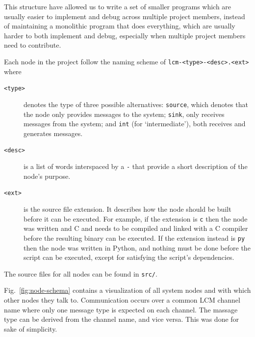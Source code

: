 This structure have allowed us to write a set of smaller programs which are usually easier to implement and debug across multiple project members,
instead of maintaining a monolithic program that does everything, which are usually harder to both implement and debug,
especially when multiple project members need to contribute.


Each node in the project follow the naming scheme of \texttt{lcm-<type>-<desc>.<ext>} where
\begin{description}
\item[\texttt{<type>}] denotes the type of three possible alternatives:
  \texttt{source}, which denotes that the node only provides messages to the system;
  \texttt{sink}, only receives messages from the system; and
  \texttt{int} (for `intermediate'), both receives and generates messages.
\item[\texttt{<desc>}] is a list of words interspaced by a \texttt{-} that provide a short description of the node's purpose.
\item[\texttt{<ext>}] is the source file extension. It describes how the node should be built before it can be executed.
  For example, if the extension is \texttt{c} then the node was written and C and needs to be compiled and linked with a C compiler before the resulting binary can be executed.
  If the extension instead is \texttt{py} then the node was written in Python, and nothing must be done before the script can be executed,
  except for satisfying the script's dependencies.
\end{description}

The source files for all nodes can be found in \texttt{src/}.

Fig.~\ref{fig:node-schema} contains a visualization of all system nodes and with which other nodes they talk to.
Communication occurs over a common LCM channel name where only one message type is expected on each channel.
The massage type can be derived from the channel name, and vice versa.
This was done for sake of simplicity.

